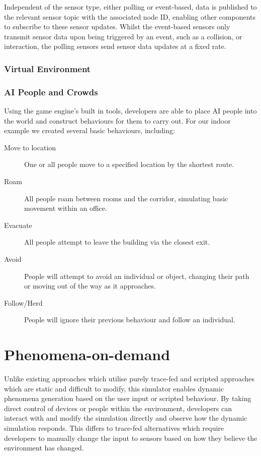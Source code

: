 Independent of the sensor type, either polling or event-based, data is published to the relevant sensor topic with the associated node ID, enabling other components to subscribe to these sensor updates. Whilst the event-based sensors only transmit sensor data upon being triggered by an event, such as a collision, or interaction, the polling sensors send sensor data updates at a fixed rate.

\subsubsection{Virtual Environment} %
\label{ssub:virtual_environment}


\subsubsection{AI People and Crowds} %
\label{ssub:ai_people_and_crowds}
Using the game engine's built in tools, developers are able to place AI people into the world and construct behaviours for them to carry out. For our indoor example we created several basic behaviours, including:

\begin{description}
  \item[Move to location] One or all people move to a specified location by the shortest route.
  \item[Roam] All people roam between rooms and the corridor, simulating basic movement within an office.
  \item[Evacuate] All people attempt to leave the building via the closest exit.
  \item[Avoid] People will attempt to avoid an individual or object, changing their path or moving out of the way as it approaches.
  \item[Follow/Herd] People will ignore their previous behaviour and follow an individual.
\end{description}


\section{Phenomena-on-demand} %
\label{sec:phenomena_on_demand}
Unlike existing approaches which utilise purely trace-fed and scripted approaches which are static and difficult to modify, this simulator enables dynamic phenomena generation based on the user input or scripted behaviour. 
By taking direct control of devices or people within the environment, developers can interact with and modify the simulation directly and observe how the dynamic simulation responds. This differs to trace-fed alternatives which require developers to manually change the input to sensors based on how they believe the environment has changed. 

